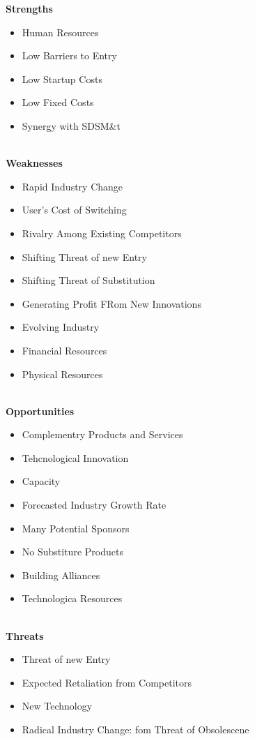 \textbf{Strengths}
\begin{itemize}
	\item Human Resources
	\item Low Barriers to Entry
	\item Low Startup Costs
	\item Low Fixed Costs
	\item Synergy with SDSM\&t
\end{itemize}
\\
\textbf{Weaknesses}
\begin{itemize}
	\item Rapid Industry Change
	\item User's Cost of Switching
	\item Rivalry Among Existing Competitors
	\item Shifting Threat of new Entry
	\item Shifting Threat of Substitution
	\item Generating Profit FRom New Innovations
	\item Evolving Industry
	\item Financial Resources
	\item Physical Resources
\end{itemize}
\\
\textbf{Opportunities}
\begin{itemize}
	\item Complementry Products and Services
	\item Tehcnological Innovation
	\item Capacity
	\item Forecasted Industry Growth Rate
	\item Many Potential Sponsors
	\item No Substiture Products 
	\item Building Alliances
	\item Technologica Resources
\end{itemize}
\\

\textbf{Threats}
\begin{itemize}
	\item Threat of new Entry
	\item Expected Retaliation from Competitors
	\item New Technology
	\item Radical Industry Change: fom Threat of Obsolescene
\end{itemize}